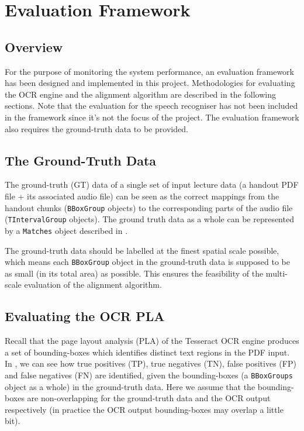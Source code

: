 
\chapter{Evaluation Framework}
\label{chap:eval-framework}

\ifpdf
    \graphicspath{{Chapter7/Figs/Raster/}{Chapter7/Figs/PDF/}{Chapter7/Figs/}}
\else
    \graphicspath{{Chapter7/Figs/Vector/}{Chapter7/Figs/}}
\fi


\section{Overview}

For the purpose of monitoring the system performance, an evaluation framework has been designed and implemented in this project. Methodologies for evaluating the OCR engine and the alignment algorithm are described in the following sections. Note that the evaluation for the speech recogniser has not been included in the framework since it's not the focus of the project. The evaluation framework also requires the ground-truth data to be provided.

\section{The Ground-Truth Data}

The ground-truth (GT) data of a single set of input lecture data (a handout PDF file + its associated audio file) can be seen as the correct mappings from the handout chunks (\texttt{BBoxGroup} objects) to the corresponding parts of the audio file (\texttt{TIntervalGroup} objects). The ground truth data as a whole can be represented by a \texttt{Matches} object described in .

The ground-truth data should be labelled at the finest spatial scale possible, which means each \texttt{BBoxGroup} object in the ground-truth data is supposed to be as small (in its total area) as possible. This ensures the feasibility of the multi-scale evaluation of the alignment algorithm.

\section{Evaluating the OCR PLA}

Recall that the page layout analysis (PLA) of the Tesseract OCR engine produces a set of bounding-boxes which identifies distinct text regions in the PDF input. In , we can see how true positives (TP), true negatives (TN), false positives (FP) and false negatives (FN) are identified, given the bounding-boxes (a \texttt{BBoxGroups} object as a whole) in the ground-truth data. Here we assume that the bounding-boxes are non-overlapping for the ground-truth data and the OCR output respectively (in practice the OCR output bounding-boxes may overlap a little bit).

